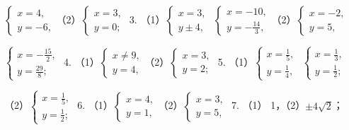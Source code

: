 \(\left\{ \begin{array}{l} x = 4, \\ y = -6, \end{array} \right.\)（2）\(\left\{ \begin{array}{l} x = 3, \\ y = 0; \end{array} \right.\)
3.
（1）\(\left\{ \begin{array}{l} x = 3, \\ y \pm 4, \end{array} \right.\) \(\left\{ \begin{array}{l} x = -10, \\ y = -\frac{14}{3}, \end{array} \right.\)（2）\(\left\{ \begin{array}{l} x = -2, \\ y = 5, \end{array} \right.\)

\(\left\{ \begin{array}{l} x = -\frac{15}{2}, \\ y = \frac{29}{8}; \end{array} \right.\)
4.
（1）\(\left\{ \begin{array}{l} x \neq 9, \\ y = 4, \end{array} \right.\)（2）\(\left\{ \begin{array}{l} x = 3, \\ y = 2; \end{array} \right.\)
5.
（1）\(\left\{ \begin{array}{l} x = \frac{1}{5}, \\ y = \frac{1}{4}, \end{array} \right.\) \(\left\{ \begin{array}{l} x = \frac{1}{3}, \\ y = \frac{1}{2}; \end{array} \right.\)

（2）\(\left\{ \begin{array}{l} x = \frac{1}{5}, \\ y = \frac{1}{2}; \end{array} \right.\)
6.
（1）\(\left\{ \begin{array}{l} x = 4, \\ y = 1, \end{array} \right.\)（2）\(\left\{ \begin{array}{l} x = 3, \\ y = 5, \end{array} \right.\)
7. （1） 1，（2）\(\pm 4\sqrt{2}\)；

